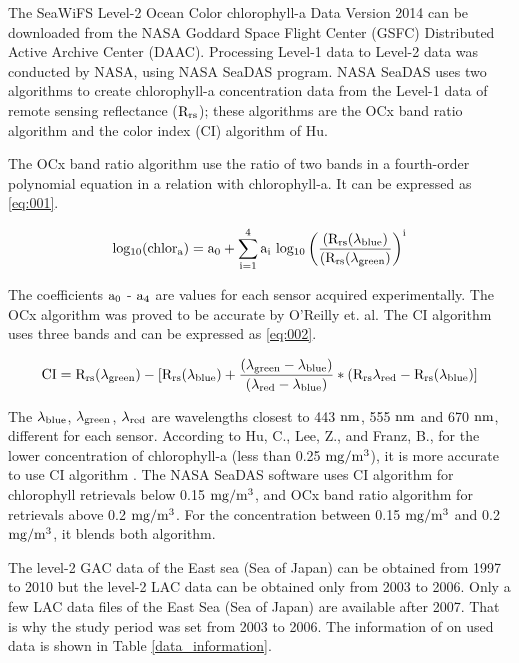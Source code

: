 The SeaWiFS Level-2 Ocean Color chlorophyll-a Data Version 2014 can be downloaded from the NASA Goddard Space Flight Center (GSFC) Distributed Active Archive Center (DAAC). Processing Level-1 data to Level-2 data was conducted by NASA, using NASA SeaDAS program\cite{NASASeaFiWSdata}. NASA SeaDAS uses two algorithms to create chlorophyll-a concentration data from the Level-1 data of remote sensing reflectance ($\rm R_{rs}$); these algorithms are the OCx band ratio algorithm and the color index (CI) algorithm of Hu. 

The OCx band ratio algorithm use the ratio of two bands in a fourth-order polynomial equation in a relation with chlorophyll-a. It can be expressed as \eqref{eq:001}.
 
 \begin{equation}
 {\rm log_{10} (chlor_a) = a_0 + \sum_{i=1}^4 a_i ~ log_{10} \left( \frac{(R_{rs}(\lambda_{blue})}{(R_{rs}(\lambda_{green})} \right) ^i }
 \label{eq:001}
 \end{equation}
 
The coefficients $\rm a_0$ - $\rm a_4$ are values for each sensor acquired experimentally. The OCx algorithm was proved to be accurate by O’Reilly et. al\cite{o2000ocean}. The CI algorithm uses three bands and can be expressed as \eqref{eq:002}.

 \begin{equation}
{\rm CI = R_{rs} ({\lambda}_{green}) - [R_{rs} ({\lambda}_{blue}) + \frac {({\lambda}_{green} - {\lambda}_{blue})} {({\lambda}_{red} - {\lambda}_{blue})} * (R_{rs}{\lambda}_{red} - R_{rs} ({\lambda}_{blue}) ]}
\label{eq:002}
\end{equation}

The $\rm {\lambda}_{blue}$, $\rm {\lambda}_{green}$, $\rm {\lambda}_{red}$ are wavelengths closest to 443 $\rm nm$, 555 $\rm nm$ and 670 $\rm nm$, different for each sensor. According to Hu, C., Lee, Z., and Franz, B., for the lower concentration of chlorophyll-a (less than 0.25 $\rm mg/m^3$), it is more accurate to use CI algorithm \cite{hu2012chlorophyll}. The NASA SeaDAS software uses CI algorithm for chlorophyll retrievals below 0.15 $\rm mg/m^3$, and OCx band ratio algorithm for retrievals above 0.2 $\rm mg/m^3$. For the concentration between 0.15 $\rm mg/m^3$ and 0.2 $\rm mg/m^3$, it blends both algorithm.


The level-2 GAC data of the East sea (Sea of Japan) can be obtained from 1997 to 2010 but the level-2 LAC data can be obtained only from 2003 to 2006. Only a few LAC data files of the East Sea (Sea of Japan) are available after 2007. That is why the study period was set from 2003 to 2006. The information of on used data is shown in Table \ref{data_information}.

